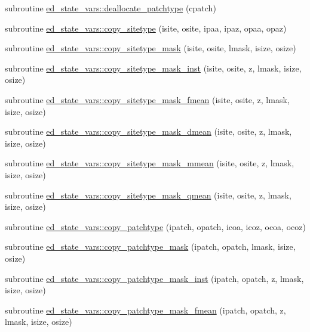 \begin{DoxyCompactItemize}
subroutine \hyperlink{namespaceed__state__vars_a2845fb7d7264ed3c00651e9e46a16ed8}{ed\+\_\+state\+\_\+vars\+::deallocate\+\_\+patchtype} (cpatch)
\item 
subroutine \hyperlink{namespaceed__state__vars_a3bf78091394d79aec34dd97e18ff16db}{ed\+\_\+state\+\_\+vars\+::copy\+\_\+sitetype} (isite, osite, ipaa, ipaz, opaa, opaz)
\item 
subroutine \hyperlink{namespaceed__state__vars_abd0a1c636db86530367e9d24e386ec22}{ed\+\_\+state\+\_\+vars\+::copy\+\_\+sitetype\+\_\+mask} (isite, osite, lmask, isize, osize)
\item 
subroutine \hyperlink{namespaceed__state__vars_a1df5eb7cbed41bfe98b1c6ac5686b8cb}{ed\+\_\+state\+\_\+vars\+::copy\+\_\+sitetype\+\_\+mask\+\_\+inst} (isite, osite, z, lmask, isize, osize)
\item 
subroutine \hyperlink{namespaceed__state__vars_aa441ba026af189af30a9464c62ad25d3}{ed\+\_\+state\+\_\+vars\+::copy\+\_\+sitetype\+\_\+mask\+\_\+fmean} (isite, osite, z, lmask, isize, osize)
\item 
subroutine \hyperlink{namespaceed__state__vars_a1589be18b91e5861e128f61854e408a6}{ed\+\_\+state\+\_\+vars\+::copy\+\_\+sitetype\+\_\+mask\+\_\+dmean} (isite, osite, z, lmask, isize, osize)
\item 
subroutine \hyperlink{namespaceed__state__vars_a37a6591c81160dba788b7db2a66003d1}{ed\+\_\+state\+\_\+vars\+::copy\+\_\+sitetype\+\_\+mask\+\_\+mmean} (isite, osite, z, lmask, isize, osize)
\item 
subroutine \hyperlink{namespaceed__state__vars_a3cf450bc1662a96c51b849a2b95f4d97}{ed\+\_\+state\+\_\+vars\+::copy\+\_\+sitetype\+\_\+mask\+\_\+qmean} (isite, osite, z, lmask, isize, osize)
\item 
subroutine \hyperlink{namespaceed__state__vars_accd794e0e8d71ba375c3669097ae5c8d}{ed\+\_\+state\+\_\+vars\+::copy\+\_\+patchtype} (ipatch, opatch, icoa, icoz, ocoa, ocoz)
\item 
subroutine \hyperlink{namespaceed__state__vars_a8d1f42b1112652da9f1e05929cdb29a1}{ed\+\_\+state\+\_\+vars\+::copy\+\_\+patchtype\+\_\+mask} (ipatch, opatch, lmask, isize, osize)
\item 
subroutine \hyperlink{namespaceed__state__vars_aa9c50f14b3b7cdf0b27019486921c8dd}{ed\+\_\+state\+\_\+vars\+::copy\+\_\+patchtype\+\_\+mask\+\_\+inst} (ipatch, opatch, z, lmask, isize, osize)
\item 
subroutine \hyperlink{namespaceed__state__vars_a1b0d514260b90af76ca01eb35453722a}{ed\+\_\+state\+\_\+vars\+::copy\+\_\+patchtype\+\_\+mask\+\_\+fmean} (ipatch, opatch, z, lmask, isize, osize)

\end{DoxyCompactItemize}
